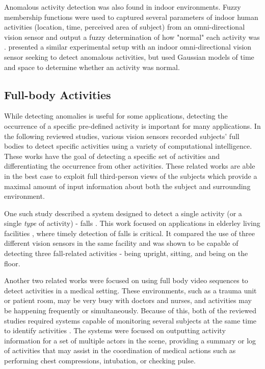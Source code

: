 \documentclass[12pt]{report}
\begin{document}
Anomalous activity detection was also found in indoor environments. Fuzzy membership functions were used to captured several parameters of indoor human activities (location, time, perceived area of subject) from an omni-directional vision sensor and output a fuzzy determination of how "normal" each activity was \cite{Seki2009}. \cite{Yiping2006} presented a similar experimental setup with an indoor omni-directional vision sensor seeking to detect anomalous activities, but used Gaussian models of time and space to determine whether an activity was normal.

\subsection{Full-body Activities}

While detecting anomalies is useful for some applications, detecting the occurrence of a specific pre-defined activity is important for many applications. In the following reviewed studies, various vision sensors recorded subjects’ full bodies to detect specific activities using a variety of computational intelligence. These works have the goal of detecting a specific set of activities and differentiating the occurrence from other activities. These related works are able in the best case to exploit full third-person views of the subjects which provide a maximal amount of input information about both the subject and surrounding environment.

One such study described a system designed to detect a single activity (or a single \textit{type} of activity) - falls \cite{Banerjee2014}. This work focused on applications in elderley living facilities , where timely detection of falls is critical.  It compared the use of three different vision sensors in the same facility and was shown to be capable of detecting three fall-related activities - being upright, sitting, and being on the floor.

Another two related works were focused on using full body video sequences to detect activities in a medical setting. These environments, such as a trauma unit or patient room, may be very busy with doctors and nurses, and activities may be happening frequently or simultaneously. Because of this, both of the reviewed studies required systems capable of monitoring several subjects at the same time to identify activities \cite{Chakraborty2013, Bloisi2009}. The systems were focused on outputting activity information for a set of multiple actors in the scene, providing a summary or log of activities that may assist in the coordination of medical actions such as performing chest compressions, intubation, or checking pulse.
\end{document}

